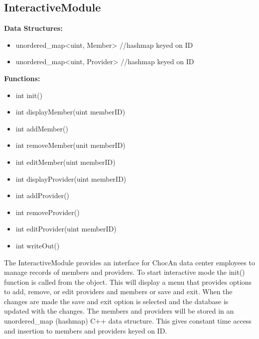 \documentclass{article}
\begin{document}
\subsection{InteractiveModule}
\textbf{Data Structures:}
\begin{itemize}
   \item unordered_map<uint, Member>   //hashmap keyed on ID
   \item unordered_map<uint, Provider>   //hashmap keyed on ID
\end{itemize}
\textbf{Functions:}
\begin{itemize}
   \item int init()
   \item int displayMember(uint memberID)
   \item int addMember()
   \item int removeMember(unit memberID)
   \item int editMember(uint memberID)
   \item int displayProvider(uint memberID)
   \item int addProvider()
   \item int removeProvider()
   \item int editProvider(uint memberID)
   \item int writeOut()
\end{itemize}
The InteractiveModule provides an interface for ChocAn data center employees to manage records of members and providers. To start interactive mode the init() function is called from the object. This will display a menu that provides options to add, remove, or edit providers and members or save and exit. When the changes are made the save and exit option is selected and the database is updated with the changes. The members and providers will be stored in an unordered_map (hashmap) C++ data structure. This gives constant time access and insertion to members and providers keyed on ID.
\end{document}

